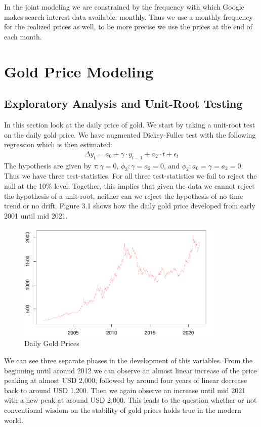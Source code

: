 \documentclass[a4paper]{article}
\theoremstyle{definition}
\begin{document}
In the joint modeling we are constrained by the frequency with which Google makes search interest data available: monthly. Thus we use a monthly frequency for the realized prices as well, to be more precise we use the prices at the end of each month. 
\newpage
\section{Gold Price Modeling}
\subsection{Exploratory Analysis and Unit-Root Testing}
In this section look at the daily price of gold. We start by taking a unit-root test on the daily gold price. We have augmented Dickey-Fuller test with the following regression which is then estimated:
	\begin{align*}
	\Delta y_t = a_0 + \gamma \cdot y_{t-1} + a_2 \cdot t + \epsilon_{t}
	\end{align*}
The hypothesis are given by $\tau: \gamma = 0$, $\phi_3: \gamma = a_2 = 0$, and $\phi_2: a_0 = \gamma = a_2 = 0$. Thus we have three test-statistics. For all three test-statistics we fail to reject the null at the 10\% level. Together, this implies that given the data we cannot reject the hypothesis of a unit-root, neither can we reject the hypothesis of no time trend or no drift. Figure 3.1 shows how the daily gold price developed from early 2001 until mid 2021.
	\begin{figure}[!t]
	\centering
	\caption{Daily Gold Prices}
	\includegraphics[width=0.90\textwidth]{goldPriceHF.pdf}
	\end{figure}

We can see three separate phases in the development of this variables. From the beginning until around 2012 we can observe an almost linear increase of the price peaking at almost USD 2,000, followed by around four years of linear decrease back to around USD 1,200. Then we again observe an increase until mid 2021 with a new peak at around USD 2,000. This leads to the question whether or not conventional wisdom on the stability of gold prices holds true in the modern world.
\end{document}
